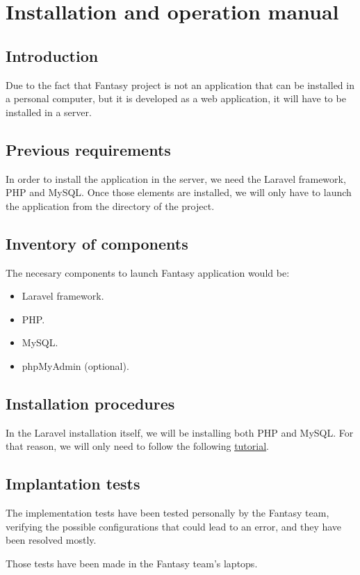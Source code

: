 \chapter{Installation and operation manual}
\section{Introduction}
Due to the fact that Fantasy project is not an application that can be installed in a personal computer, but it is developed as a web application, it will have to be installed in a server.

\section{Previous requirements}
In order to install the application in the server, we need the Laravel framework, PHP and MySQL. Once those elements are installed, we will only have to launch the application from the directory of the project.

\section{Inventory of components}
The necesary components to launch Fantasy application would be:
\begin{itemize}
	\item Laravel framework.
	\item PHP.
	\item MySQL.
	\item phpMyAdmin (optional).
\end{itemize}

\section{Installation procedures}
In the Laravel installation itself, we will be installing both PHP and MySQL. For that reason, we will only need to follow the following \href{https://styde.net/instalacion-de-composer-y-laravel/}{tutorial}.

\section{Implantation tests}
The implementation tests have been tested personally by the Fantasy team, verifying the possible configurations that could lead to an error, and they have been resolved mostly.

Those tests have been made in the Fantasy team's laptops.